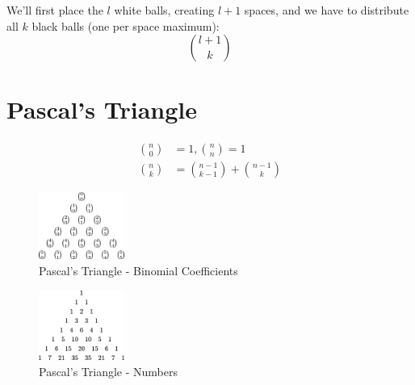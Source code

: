 \documentclass[00_complete]{subfiles}
\begin{document}
We'll first place the $l$ white balls, creating $l+1$ spaces, and we have to
distribute all $k$ black balls (one per space maximum):
$$\binom{l+1}{k}$$

\section{Pascal's Triangle}

\begin{reminder}
    \begin{align*}
        \binom{n}{0} &= 1, \binom{n}{n} = 1 \\
        \binom{n}{k} &= \binom{n-1}{k-1} + \binom{n-1}{k}
    \end{align*}
\end{reminder}

\begin{figure}[ht]
  \centering
    \includegraphics[width=0.25\textwidth]{pascals-binom}
    \caption{Pascal's Triangle - Binomial Coefficients}
\end{figure}
\begin{figure}[ht]
  \centering
    \includegraphics[width=0.25\textwidth]{pascals-trig}
    \caption{Pascal's Triangle - Numbers}
\end{figure}
\end{document}
